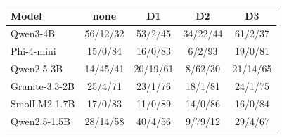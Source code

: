 \begin{tabular}{@{}lcccc@{}}
\toprule
Model & none & D1 & D2 & D3 \\
\midrule
Qwen3-4B & 56/12/32 & 53/2/45 & 34/22/44 & 61/2/37 \\
Phi-4-mini & 15/0/84 & 16/0/83 & 6/2/93 & 19/0/81 \\
Qwen2.5-3B & 14/45/41 & 20/19/61 & 8/62/30 & 21/14/65 \\
Granite-3.3-2B & 25/4/71 & 23/1/76 & 18/1/81 & 24/1/75 \\
SmolLM2-1.7B & 17/0/83 & 11/0/89 & 14/0/86 & 16/0/84 \\
Qwen2.5-1.5B & 28/14/58 & 40/4/56 & 9/79/12 & 29/4/67 \\
\bottomrule
\end{tabular}